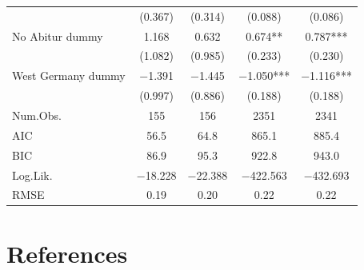 \documentclass[
]{article}
\begin{document}
\begin{table}[!h]
\begin{tabular}[t]{lcccc}
 & (\num{0.367}) & (\num{0.314}) & (\num{0.088}) & (\num{0.086})\\
No Abitur dummy & \num{1.168} & \num{0.632} & \num{0.674}** & \num{0.787}***\\
 & (\num{1.082}) & (\num{0.985}) & (\num{0.233}) & (\num{0.230})\\
West Germany dummy & \num{-1.391} & \num{-1.445} & \num{-1.050}*** & \num{-1.116}***\\
 & (\num{0.997}) & (\num{0.886}) & (\num{0.188}) & (\num{0.188})\\
\midrule
Num.Obs. & \num{155} & \num{156} & \num{2351} & \num{2341}\\
AIC & \num{56.5} & \num{64.8} & \num{865.1} & \num{885.4}\\
BIC & \num{86.9} & \num{95.3} & \num{922.8} & \num{943.0}\\
Log.Lik. & \num{-18.228} & \num{-22.388} & \num{-422.563} & \num{-432.693}\\
RMSE & \num{0.19} & \num{0.20} & \num{0.22} & \num{0.22}\\
\bottomrule
\end{tabular}
\end{table}

\FloatBarrier

\hypertarget{references}{%
\section*{References}\label{references}}
\end{document}
